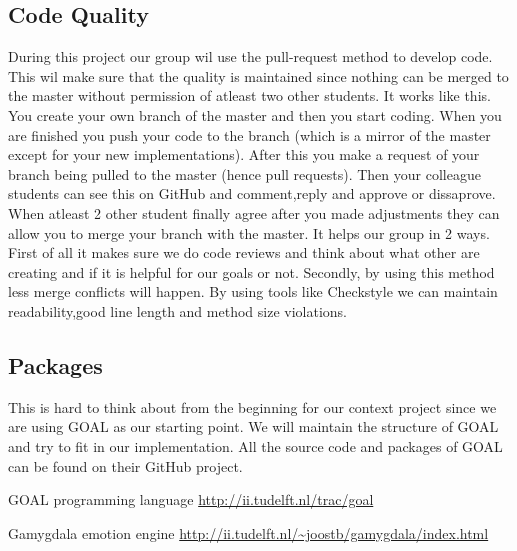 \documentclass[]{article}
\begin{document}
\subsection{Code Quality}
During this project our group wil use the pull-request method to develop code. This wil make sure that the quality is maintained since nothing can be merged to the \gls{master} without permission of atleast two other students. It works like this. You create your own branch of the master and then you start coding. When you are finished you push your code to the branch (which is a mirror of the master except for your new implementations). After this you make a request of your branch being pulled to the master (hence pull requests). Then your colleague students can see this on GitHub and comment,reply and approve or dissaprove. When atleast 2 other student finally agree after you made adjustments they can allow you to merge your branch with the master. It helps our group in 2 ways. First of all it makes sure we do code reviews and think about what other are creating and if it is helpful for our goals or not. Secondly, by using this method less merge conflicts will happen.
By using tools like Checkstyle we can maintain readability,good line length and method size violations.

\subsection{Packages}
This is hard to think about from the beginning for our context project since we are using GOAL as our starting point. We will maintain the structure of GOAL and try to fit in our implementation. All the source code and \gls{packages} of GOAL can be found on their GitHub project.

\clearpage
\printglossaries


\begin{thebibliography}{9}
	
	GOAL programming language
	\url{http://ii.tudelft.nl/trac/goal}
	
	Gamygdala emotion engine
	\url{http://ii.tudelft.nl/~joostb/gamygdala/index.html}
	
	
\end{thebibliography}
\end{document}
